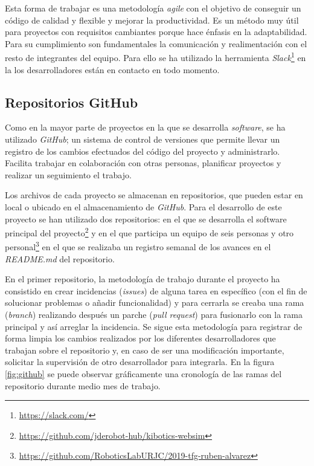 Esta forma de trabajar es una metodología \textit{agile} con el objetivo de conseguir un código de calidad y flexible y mejorar la productividad. Es un método muy útil para proyectos con requisitos cambiantes porque hace énfasis en la adaptabilidad. 
Para su cumplimiento son fundamentales la comunicación y realimentación con el resto de integrantes del equipo. Para ello se ha utilizado la herramienta \textit{Slack}\footnote{\url{https://slack.com/}} en la los desarrolladores están en contacto en todo momento.


\subsection{Repositorios GitHub}
\label{subsec:github}
Como en la mayor parte de proyectos en la que se desarrolla \textit{software}, se ha utilizado \textit{GitHub}; un sistema de control de versiones que permite llevar un registro de los cambios efectuados del código del proyecto y administrarlo. Facilita trabajar en colaboración con otras personas, planificar proyectos y realizar un seguimiento el trabajo. \newline

Los archivos de cada proyecto se almacenan en repositorios, que pueden estar en local o ubicado en el almacenamiento de \textit{GitHub}. Para el desarrollo de este proyecto se han utilizado dos repositorios:  en el que se desarrolla el software principal del proyecto\footnote{\url{https://github.com/jderobot-hub/kibotics-websim}} y en el que participa un equipo de seis personas y otro personal\footnote{\url{https://github.com/RoboticsLabURJC/2019-tfg-ruben-alvarez}} en el que se realizaba un registro semanal de los avances en el \textit{README.md} del repositorio.
\newline

En el primer repositorio, la metodología de trabajo durante el proyecto ha consistido en crear incidencias (\textit{issues}) de alguna tarea en específico (con el fin de solucionar problemas o añadir funcionalidad) y para cerrarla se creaba una rama (\textit{branch}) realizando después un parche (\textit{pull request}) para fusionarlo con la rama principal y así arreglar la incidencia. Se sigue esta metodología para registrar de forma limpia los cambios realizados por los diferentes desarrolladores que trabajan sobre el repositorio y, en caso de ser una modificación importante, solicitar la supervisión de otro desarrollador para integrarla. En la figura \ref{fig:github} se puede observar gráficamente una cronología de las ramas del repositorio durante medio mes de trabajo.

